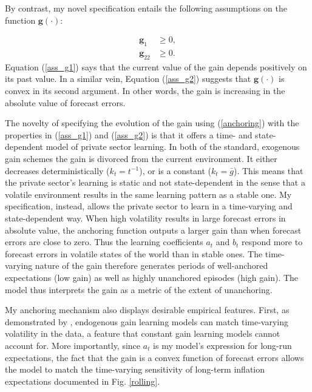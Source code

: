 \documentclass[11pt]{article}
\renewcommand{\[}{\begin{equation}}
\renewcommand{\]}{\end{equation}}
\begin{document}
By contrast, my novel specification entails the following assumptions on the function $\mathbf{g(\cdot)}$:

\begin{align}
\mathbf{g}_1 & \geq 0 \label{ass_g1}, \\
\mathbf{g}_{22} & \geq 0 \label{ass_g2}.
\end{align}
Equation (\ref{ass_g1}) says that the current value of the gain depends positively on its past value. In a similar vein, Equation (\ref{ass_g2}) suggests that $\mathbf{g}(\cdot)$ is convex in its second argument. In other words, the gain is increasing in the absolute value of forecast errors. 

The novelty of specifying the evolution of the gain using (\ref{anchoring}) with the properties in (\ref{ass_g1}) and (\ref{ass_g2}) is that it offers a time- and state-dependent model of private sector learning. In both of the standard, exogenous gain schemes the gain is divorced from the current environment. It either decreases deterministically ($k_t = t^{-1}$), or is a constant ($k_t = \bar{g}$). This means that the private sector's learning is static and not state-dependent in the sense that a volatile environment results in the same learning pattern as a stable one. My specification, instead, allows the private sector to learn in a time-varying and state-dependent way. When high volatility results in large forecast errors in absolute value, the anchoring function outputs a larger gain than when forecast errors are close to zero. Thus the learning coefficients $a_t$ and $b_t$ respond more to forecast errors in volatile states of the world than in stable ones. The time-varying nature of the gain therefore generates periods of well-anchored expectations (low gain) as well as highly unanchored episodes (high gain). The model thus interprets the gain as a metric of the extent of unanchoring. 

My anchoring mechanism also displays desirable empirical features. First, as demonstrated by \cite{milani2014learning}, endogenous gain learning models can match time-varying volatility in the data, a feature that constant gain learning models cannot account for. More importantly, since $a_t$ is my model's expression for long-run expectations, the fact that the gain is a convex function of forecast errors allows the model to match the time-varying sensitivity of long-term inflation expectations documented in Fig. \ref{rolling}.
\end{document}
